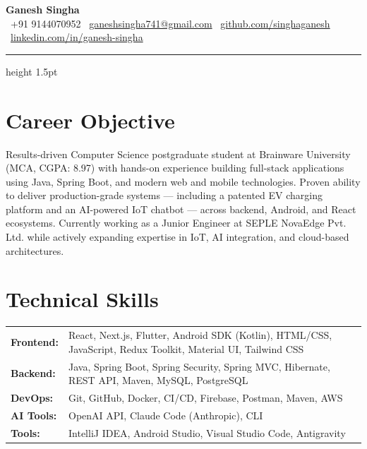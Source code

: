 \documentclass[10pt, a4paper]{article}
\begin{document}
\begin{center}
  {\Huge\bfseries Ganesh Singha} \\[4pt]
  \small
  \faPhone\ +91 9144070952 \quad
  \faEnvelope\ \href{mailto:ganeshsingha741@gmail.com}{ganeshsingha741@gmail.com} \quad
  \faGithub\ \href{https://github.com/singhaganesh}{github.com/singhaganesh} \quad
  \faLinkedin\ \href{https://www.linkedin.com/in/ganesh-singha/}{linkedin.com/in/ganesh-singha}
\end{center}

\vspace{2pt}
\hrule height 1.5pt
\vspace{6pt}

\section{Career Objective}
Results-driven Computer Science postgraduate student at Brainware University (MCA, CGPA: 8.97) with hands-on experience building full-stack applications using Java, Spring Boot, and modern web and mobile technologies. Proven ability to deliver production-grade systems --- including a patented EV charging platform and an AI-powered IoT chatbot --- across backend, Android, and React ecosystems. Currently working as a Junior Engineer at SEPLE NovaEdge Pvt. Ltd. while actively expanding expertise in IoT, AI integration, and cloud-based architectures.

\section{Technical Skills}
\begin{tabular}{@{}p{3cm} p{13cm}}
  \textbf{Frontend:}   & React, Next.js, Flutter, Android SDK (Kotlin), HTML/CSS, JavaScript, Redux Toolkit, Material UI, Tailwind CSS \\[2pt]
  \textbf{Backend:}    & Java, Spring Boot, Spring Security, Spring MVC, Hibernate, REST API, Maven, MySQL, PostgreSQL \\[2pt]
  \textbf{DevOps:}     & Git, GitHub, Docker, CI/CD, Firebase, Postman, Maven, AWS \\[2pt]
  \textbf{AI Tools:}   & OpenAI API, Claude Code (Anthropic), CLI \\[2pt]
  \textbf{Tools:}      & IntelliJ IDEA, Android Studio, Visual Studio Code, Antigravity \\
\end{tabular}
\end{document}
